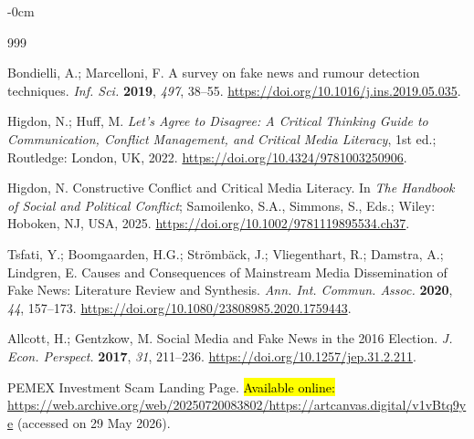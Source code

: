 \documentclass[informatics,article,accept,pdftex,moreauthors]{Definitions/mdpi}
\begin{document}


\begin{adjustwidth}{-\extralength}{0cm}


\begin{thebibliography}{999}
 
 
Bondielli, A.; Marcelloni, F. A survey on fake news and rumour detection techniques. \textit{Inf. Sci.} \textbf{2019}, \textit{497}, 38--55. \href{https://doi.org/10.1016/j.ins.2019.05.035}{https://doi.org/10.1016/j.ins.2019.05.035}.
 
Higdon, N.; Huff, M. \textit{Let's Agree to Disagree: A Critical Thinking Guide to Communication, Conflict Management, and Critical Media Literacy}, 1st ed.; Routledge: London, UK, {2022}. \href{https://doi.org/10.4324/9781003250906}{https://doi.org/10.4324/9781003250906}.
 
Higdon, N. Constructive Conflict and Critical Media Literacy. In \textit{The Handbook of Social and Political Conflict}; Samoilenko, S.A., Simmons, S., Eds.; Wiley: Hoboken, NJ, USA, {2025}. \href{https://doi.org/10.1002/9781119895534.ch37}{https://doi.org/10.1002/9781119895534.ch37}.
 
Tsfati, Y.; Boomgaarden, H.G.; Strömbäck, J.; Vliegenthart, R.; Damstra, A.; Lindgren, E. Causes and Consequences of Mainstream Media Dissemination of Fake News: Literature Review and Synthesis. \textit{Ann. Int. Commun. Assoc.} \textbf{2020}, \textit{44}, 157--173. \href{https://doi.org/10.1080/23808985.2020.1759443}{https://doi.org/10.1080/23808985.2020.1759443}.
 
Allcott, H.; Gentzkow, M. Social Media and Fake News in the 2016 Election. \textit{J. Econ. Perspect.} \textbf{2017}, \textit{31}, 211--236. \href{https://doi.org/10.1257/jep.31.2.211}{https://doi.org/10.1257/jep.31.2.211}.
 
PEMEX Investment Scam Landing Page. \hl{Available online:} {\url{https://web.archive.org/web/20250720083802/https://artcanvas.digital/v1vBtq9ye}} (accessed on 29 May 2026). %
 

\end{thebibliography}
\end{adjustwidth}
\end{document}
